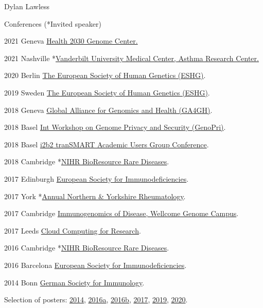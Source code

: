 \documentclass[12pt,a4paper]{article}
\begin{document}
\begin{cv}{Dylan Lawless}
\begin{cvlist}{Conferences \textnormal{(*Invited speaker)}}
	\item [2021 Geneva] \href{https://www.health2030genome.ch}{Health 2030 Genome Center.}
	\item [2021 Nashville] *\href{https://www.vumc.org/medicine-public-health/}{Vanderbilt University Medical Center, Asthma Research Center.}
	\item [2020 Berlin] \href{https://www.eshg.org/}{The European Society
of Human Genetics (ESHG)}.
	\item [2019 Sweden] \href{https://www.eshg.org/}{The European Society
of Human Genetics (ESHG)}.
	\item [2018 Geneva] \href{https://broadinstitute.swoogo.com/ga4gh6thplenary}{Global Alliance for Genomics and Health (GA4GH)}.
	\item [2018 Basel] \href{https://www.genopri.org}{Int Workshop on Genome Privacy and Security (GenoPri)}.
	\item [2018 Basel] \href{https://transmartfoundation.org/europe-fall-meeting-2018/}{i2b2 tranSMART Academic Users Group Conference}.
	\item [2018 Cambridge] *\href{https://www.cambridgebioresource.group.cam.ac.uk/volunteers/rare}{NIHR BioResource Rare Diseases}.
  \item [2017 Edinburgh] \href{http://esid2017.kenes.com/}{European Society for Immunodeficiencies}.  
  \item [2017 York] *\href{https://medhealth.leeds.ac.uk/events/event/86/combined_northern_and_yorkshire_annual_rheumatology_meeting_national_railway_museum_york}{Annual Northern \& Yorkshire Rheumatology}.
  \item [2017 Cambridge] \href{https://coursesandconferences.wellcomegenomecampus.org/Conferences.wt}{Immunogenomics of Disease, Wellcome Genome Campus}.
  \item [2017 Leeds]  \href{http://arc.leeds.ac.uk}{Cloud Computing for Research}.
  \item [2016 Cambridge] *\href{http://www.cambridgebioresource.group.cam.ac.uk/volunteers/rare}{NIHR BioResource Rare Diseases}.
  \item [2016 Barcelona] \href{http://esid.org/}{European Society for Immunodeficiencies}.
  \item [2014 Bonn] \href{http://www.immunology-conference.de/}{German Society for Immunology}.
  \end{cvlist}
  
\noindent Selection of posters:
\href{https://dylanlawless.github.io/resume/pdf/posters/2014_lawless_poxviral_evasion}{2014},
\href{https://dylanlawless.github.io/resume/pdf/posters/2016_ESID_lawless_RAG1}{2016a},
\href{https://dylanlawless.github.io/resume/pdf/posters/2016_ESID_lawless_TTC7A}{2016b},
\href{https://dylanlawless.github.io/resume/pdf/posters/2017_ESID_lawless_TNFAIP3_A20}{2017},
\href{https://dylanlawless.github.io/resume/pdf/posters/2019_ESHG_lawless_viral_succept}{2019},
\href{https://dylanlawless.github.io/resume/pdf/posters/2020_lawless_rare_variant_networks}{2020}.


\end{cv}
\end{document}
